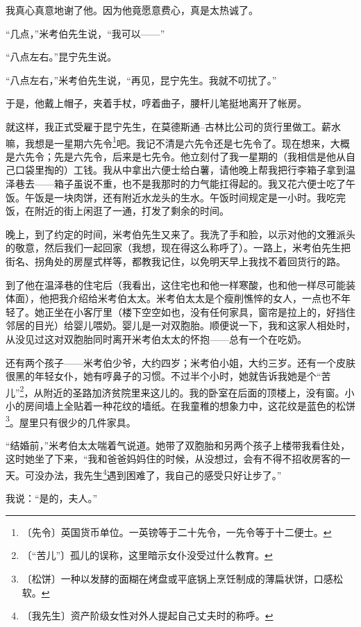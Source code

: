 \documentclass[12pt,UTF-8,openany]{ctexbook}
\begin{document}
\begin{normalsize}
    我真心真意地谢了他。因为他竟愿意费心，真是太热诚了。
    
    “几点，”米考伯先生说，“我可以——”
    
    “八点左右。”昆宁先生说。
    
    “八点左右，”米考伯先生说，“再见，昆宁先生。我就不叨扰了。”
    
    于是，他戴上帽子，夹着手杖，哼着曲子，腰杆儿笔挺地离开了帐房。
    
    就这样，我正式受雇于昆宁先生，在莫德斯通–古林比公司的货行里做工。薪水嘛，我想是一星期六先令\footnote{〔先令〕英国货币单位。一英镑等于二十先令，一先令等于十二便士。}吧。我记不清是六先令还是七先令了。现在想来，大概是六先令；先是六先令，后来是七先令。他立刻付了我一星期的（我相信是他从自己口袋里掏的）工钱。我从中拿出六便士给白薯，请他晚上帮我把行李箱子拿到温泽巷去——箱子虽说不重，也不是我那时的力气能扛得起的。我又花六便士吃了午饭。午饭是一块肉饼，还有附近水龙头的生水。午饭时间规定是一小时。我吃完饭，在附近的街上闲逛了一通，打发了剩余的时间。
    
    晚上，到了约定的时间，米考伯先生又来了。我洗了手和脸，以示对他的文雅派头的敬意，然后我们一起回家（我想，现在得这么称呼了）。一路上，米考伯先生把街名、拐角处的房屋式样等，都教我记住，以免明天早上我找不着回货行的路。
    
    到了他在温泽巷的住宅后（我看出，这住宅也和他一样寒酸，也和他一样尽可能装体面），他把我介绍给米考伯太太。米考伯太太是个瘦削憔悴的女人，一点也不年轻了。她正坐在小客厅里（楼下空空如也，没有任何家具，窗帘是拉上的，好挡住邻居的目光）给婴儿喂奶。婴儿是一对双胞胎。顺便说一下，我和这家人相处时，从没见过这对双胞胎同时离开米考伯太太的怀抱——总有一个在吃奶。
    
    还有两个孩子——米考伯少爷，大约四岁；米考伯小姐，大约三岁。还有一个皮肤很黑的年轻女仆，她有哼鼻子的习惯。不过半个小时，她就告诉我她是个“苦儿”\footnote{〔“苦儿”〕孤儿的误称，这里暗示女仆没受过什么教育。}，从附近的圣路加济贫院里来这儿的。我的卧室在后面的顶楼上，没有窗。小小的房间墙上全贴着一种花纹的墙纸。在我童稚的想象力中，这花纹是蓝色的松饼\footnote{〔松饼〕一种以发酵的面糊在烤盘或平底锅上烹饪制成的薄扁状饼，口感松软。}。屋里只有很少的几件家具。
    
    “结婚前，”米考伯太太喘着气说道。她带了双胞胎和另两个孩子上楼带我看住处，这时她坐了下来，“我和爸爸妈妈住的时候，从没想过，会有不得不招收房客的一天。可没办法，我先生\footnote{〔我先生〕资产阶级女性对外人提起自己丈夫时的称呼。}遇到困难了，我自己的感受只好让步了。”
    
    我说：“是的，夫人。”
    

\end{normalsize}
\end{document}
